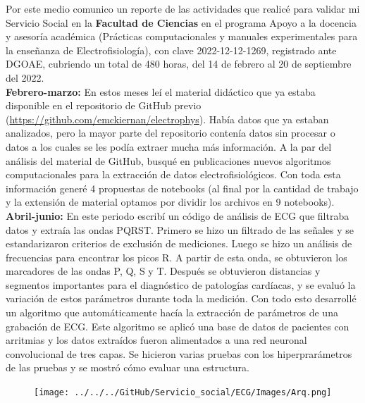 \documentclass[11pt,letterpaper]{article}
\begin{document}
\begin{justify}
\hspace{-3cm} Por este medio comunico un reporte de las actividades que realicé para validar mi Servicio Social en la \textbf{Facultad de Ciencias} en el programa Apoyo a la docencia y asesoría académica (Prácticas computacionales y manuales experimentales para la enseñanza de  Electrofisiología), con clave 2022-12-12-1269, registrado ante DGOAE, cubriendo un total de 480 horas, del 14 de febrero al 20 de septiembre del 2022. \\
\linebreak
\textbf{Febrero-marzo:} En estos meses leí el material didáctico que ya estaba disponible en el repositorio de GitHub previo (\href{https://github.com/emckiernan/electrophys}{https://github.com/emckiernan/electrophys}). Había datos que ya estaban analizados, pero la mayor parte del repositorio contenía datos sin procesar o datos a los cuales se les podía extraer mucha más información. A la par del análisis del material de GitHub, busqué en publicaciones nuevos algoritmos computacionales para la extracción de datos electrofisiológicos. Con toda esta información generé 4 propuestas de notebooks (al final por la cantidad de trabajo y la extensión de material optamos por dividir los archivos en 9 notebooks).  \linebreak
\hfill \\
\textbf{Abril-junio:} En este periodo escribí un código de análisis de ECG que filtraba datos y extraía las ondas PQRST. Primero se hizo un filtrado de las señales y se estandarizaron criterios de exclusión de mediciones. Luego se hizo un análisis de frecuencias para encontrar los picos R. A partir de esta onda, se obtuvieron los marcadores de las ondas P, Q, S y T. Después se obtuvieron distancias y segmentos importantes para el diagnóstico de patologías cardíacas, y se evaluó la variación de estos parámetros durante toda la medición. Con todo esto desarrollé un algoritmo que automáticamente hacía la extracción de parámetros de una grabación de ECG.  Este algoritmo se aplicó una base de datos de pacientes con arritmias y los datos extraídos fueron alimentados a una red neuronal convolucional de tres capas. Se hicieron varias pruebas con los hiperprarámetros de las pruebas y se mostró cómo evaluar una estructura.  \\
\begin{figure}[H]
\centering
\begin{minipage}{.48\linewidth}
\texttt{[image: ../../../GitHub/Servicio\_social/ECG/Images/Arq.png]} 

\end{minipage}
\end{figure}
\end{justify}
\end{document}
